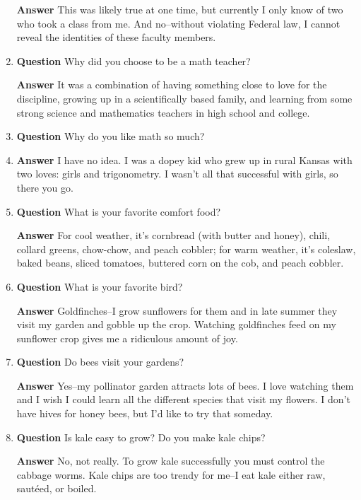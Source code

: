\documentclass[11pt]{article}
\newcounter{ex}\setcounter{ex}{0}
\newcounter{dy}\setcounter{dy}{0}
\begin{document}
\begin{enumerate}
 \textbf{Answer}  This was likely true at one time, but currently I only know of two who 
 took a class from me. And no--without violating Federal law, I cannot reveal the identities of
 these faculty members.

\item  \textbf{Question} Why did you choose to be a math teacher?

\textbf{Answer} It was a combination of having something close to 
love for the discipline, growing up in a scientifically based 
family, and learning from some strong science and mathematics 
teachers in high school and college.


\item \textbf{Question} Why do you like math so much?
\item 
\textbf{Answer} I have no idea. I was  a dopey kid who
grew up in rural Kansas with two loves: girls and trigonometry. I wasn't
all that successful with girls, so there you go.

\item  \textbf{Question} What is your favorite comfort food?

  \textbf{Answer}  For cool weather, it's cornbread (with butter and honey), chili, collard greens, chow-chow, and peach cobbler; for warm weather, it's coleslaw, baked beans, sliced tomatoes, buttered corn on the cob, and peach cobbler.

  \item  \textbf{Question}  What is your favorite bird?
  
  \textbf{Answer} Goldfinches--I grow sunflowers for them and in late summer
  they visit my garden and gobble up the crop. Watching goldfinches feed on my 
  sunflower
  crop gives me a 
  ridiculous amount of joy.

  \item  \textbf{Question}  Do bees visit your gardens?
  
  \textbf{Answer} Yes--my pollinator garden attracts lots of bees. I love
  watching them and I wish I could learn all the different
  species that visit my flowers. I don't have hives for honey bees, but
  I'd like to try that someday.

 \item   \textbf{Question} Is kale easy to grow? Do you make kale chips?
 
 \textbf{Answer} No, not really. To grow kale successfully  you must
 control the cabbage worms. Kale chips are too trendy for me--I eat 
 kale either raw, sautéed, or boiled.


\end{enumerate}
\end{document}
